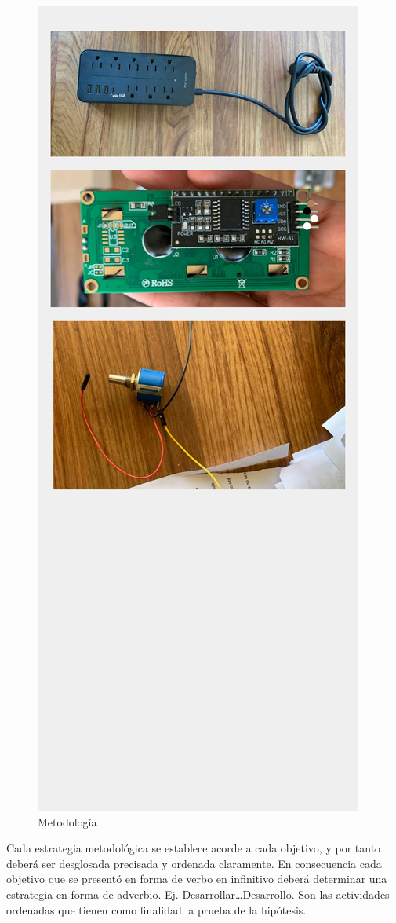     \begin{figure}[H]
        \centering
        \includegraphics[trim = {5mm 180mm 5mm 30mm},clip,scale=0.4]{16/Img/instructivoCE(4).pdf}
        \caption{Metodología}
        \label{fig:InstructivoCE4}
    \end{figure}
    Cada estrategia metodológica se establece acorde a cada objetivo, y por tanto deberá ser desglosada precisada y ordenada claramente. En consecuencia cada objetivo que se presentó en forma de verbo en infinitivo deberá determinar una estrategia en forma de adverbio. Ej. Desarrollar…Desarrollo. Son las actividades ordenadas que tienen como finalidad la prueba de la hipótesis. 
    
